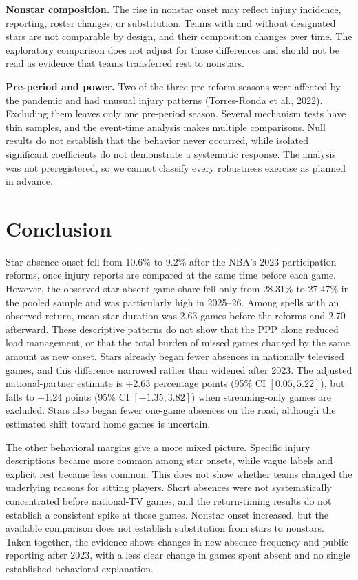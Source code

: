 \documentclass[11pt]{article}
\begin{document}
\noindent\textbf{Nonstar composition.} The rise in nonstar onset may reflect injury incidence, reporting, roster changes, or substitution. Teams with and without designated stars are not comparable by design, and their composition changes over time. The exploratory comparison does not adjust for those differences and should not be read as evidence that teams transferred rest to nonstars.

\noindent\textbf{Pre-period and power.} Two of the three pre-reform seasons were affected by the pandemic and had unusual injury patterns (Torres-Ronda et al., 2022). Excluding them leaves only one pre-period season. Several mechanism tests have thin samples, and the event-time analysis makes multiple comparisons. Null results do not establish that the behavior never occurred, while isolated significant coefficients do not demonstrate a systematic response. The analysis was not preregistered, so we cannot classify every robustness exercise as planned in advance.

\section{Conclusion}\label{sec:conclusion}

Star absence onset fell from 10.6\% to 9.2\% after the NBA's 2023 participation reforms, once injury reports are compared at the same time before each game. However, the observed star absent-game share fell only from 28.31\% to 27.47\% in the pooled sample and was particularly high in 2025--26. Among spells with an observed return, mean star duration was 2.63 games before the reforms and 2.70 afterward. These descriptive patterns do not show that the PPP alone reduced load management, or that the total burden of missed games changed by the same amount as new onset. Stars already began fewer absences in nationally televised games, and this difference narrowed rather than widened after 2023. The adjusted national-partner estimate is +2.63 percentage points (95\% CI $[0.05,5.22]$), but falls to +1.24 points (95\% CI $[-1.35,3.82]$) when streaming-only games are excluded. Stars also began fewer one-game absences on the road, although the estimated shift toward home games is uncertain.

The other behavioral margins give a more mixed picture. Specific injury descriptions became more common among star onsets, while vague labels and explicit rest became less common. This does not show whether teams changed the underlying reasons for sitting players. Short absences were not systematically concentrated before national-TV games, and the return-timing results do not establish a consistent spike at those games. Nonstar onset increased, but the available comparison does not establish substitution from stars to nonstars. Taken together, the evidence shows changes in new absence frequency and public reporting after 2023, with a less clear change in games spent absent and no single established behavioral explanation.
\end{document}
